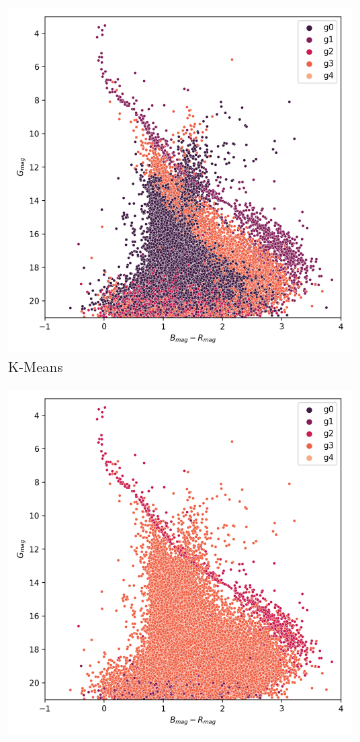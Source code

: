 \documentclass[preprint,12pt,authoryear]{elsarticle}
\begin{document}
\begin{figure}[!hbt]
  \begin{subfigure}{0.29\textwidth}
    \includegraphics[width=\textwidth]{../figures/melotte_22/kmeans_hr_diagram_melotte_22.png}
    \caption{K-Means}
  \end{subfigure}
  \begin{subfigure}{0.29\textwidth}
    \includegraphics[width=\textwidth]{../figures/melotte_22/dec_hr_diagram_melotte_22.png}

\end{subfigure}
\end{figure}
\end{document}
